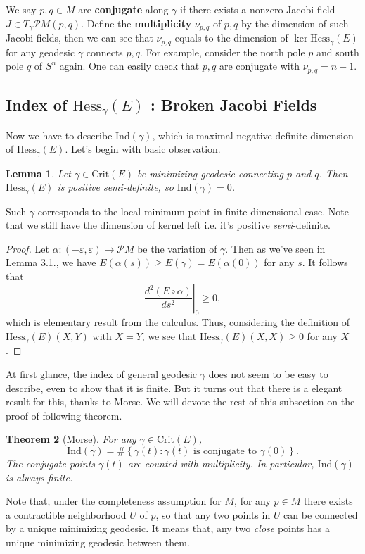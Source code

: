 \documentclass{article}
\newtheorem{theorem}{Theorem}[section]
\newtheorem{lemma}[theorem]{Lemma}
\newcommand{\ep}{\varepsilon}
\newcommand{\PM}{\mathcal{P}M}
\newcommand{\g}{\gamma}
\newcommand{\Crit}{\mathrm{Crit}}
\newcommand{\Hess}{\mathrm{Hess}}
\newcommand{\Ind}{\mathrm{Ind}}
\begin{document}
We say $p,q\in M$ are \textbf{conjugate} along $\g$ if there exists a nonzero Jacobi field $J\in T_\g\PM(p,q)$.
Define the \textbf{multiplicity} $\nu_{p,q}$ of $p,q$ by the dimension of such Jacobi fields, then we can see that $\nu_{p,q}$ equals to the dimension of $\ker\Hess_\g(E)$ for any geodesic $\g$ connects $p,q$.
For example, consider the north pole $p$ and south pole $q$ of $S^n$ again.
One can easily check that $p,q$ are conjugate with $\nu_{p,q}=n-1$.


\subsection{Index of $\Hess_\g(E)$ : Broken Jacobi Fields}
Now we have to describe $\Ind(\g)$, which is maximal negative definite dimension of $\Hess_\g(E)$.
Let's begin with basic observation.
	\begin{lemma}\rm
	Let $\g\in\Crit(E)$ be \emph{minimizing} geodesic connecting $p$ and $q$.
	Then $\Hess_\g(E)$ is positive semi-definite, so $\Ind(\g)=0$.
	\end{lemma}
Such $\g$ corresponds to the local minimum point in finite dimensional case.
Note that we still have the dimension of kernel left i.e. it's positive \emph{semi}-definite.
	\begin{proof}
	Let $\alpha:(-\ep,\ep)\to\PM$ be the variation of $\g$.
	Then as we've seen in Lemma 3.1., we have $E(\alpha(s))\geq E(\g)=E(\alpha(0))$ for any $s$.
	It follows that
		$$\left.\frac{d^2(E\circ\alpha)}{ds^2}\right|_{0}\geq0,$$
	which is elementary result from the calculus.
	Thus, considering the definition of $\Hess_\g(E)(X,Y)$ with $X=Y$, we see that $\Hess_\g(E)(X,X)\geq0$ for any $X$.
	\end{proof}
At first glance, the index of general geodesic $\g$ does not seem to be easy to describe, even to show that it is finite.
But it turns out that there is a elegant result for this, thanks to Morse.
We will devote the rest of this subsection on the proof of following theorem.
	\begin{theorem}[Morse]\rm
	For any $\g\in\Crit(E)$,
		$$\Ind(\g)=\#\left\{\g(t):\g(t)\text{ is conjugate to }\g(0)\right\}.$$
	The conjugate points $\g(t)$ are counted with multiplicity.
	In particular, $\Ind(\g)$ is always finite.
	\end{theorem}
Note that, under the completeness assumption for $M$, for any $p\in M$ there exists a contractible neighborhood $U$ of $p$, so that any two points in $U$ can be connected by a unique minimizing geodesic.
It means that, any two \emph{close} points has a unique minimizing geodesic between them.
\end{document}
